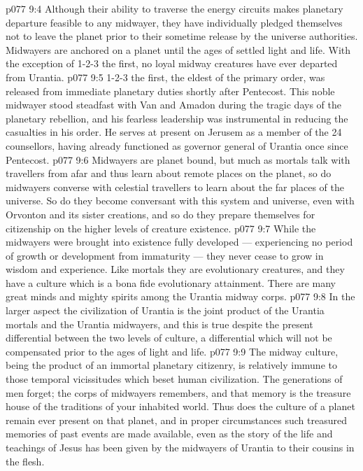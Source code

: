 \vs p077 9:4 Although their ability to traverse the energy circuits makes planetary departure feasible to any midwayer, they have individually pledged themselves not to leave the planet prior to their sometime release by the universe authorities. Midwayers are anchored on a planet until the ages of settled light and life. With the exception of 1\hyp{}2\hyp{}3 the first, no loyal midway creatures have ever departed from Urantia.
\vs p077 9:5 1\hyp{}2\hyp{}3 the first, the eldest of the primary order, was released from immediate planetary duties shortly after Pentecost. This noble midwayer stood steadfast with Van and Amadon during the tragic days of the planetary rebellion, and his fearless leadership was instrumental in reducing the casualties in his order. He serves at present on Jerusem as a member of the 24 counsellors, having already functioned as governor general of Urantia once since Pentecost.
\vs p077 9:6 \pc Midwayers are planet bound, but much as mortals talk with travellers from afar and thus learn about remote places on the planet, so do midwayers converse with celestial travellers to learn about the far places of the universe. So do they become conversant with this system and universe, even with Orvonton and its sister creations, and so do they prepare themselves for citizenship on the higher levels of creature existence.
\vs p077 9:7 While the midwayers were brought into existence fully developed --- experiencing no period of growth or development from immaturity --- they never cease to grow in wisdom and experience. Like mortals they are evolutionary creatures, and they have a culture which is a bona fide evolutionary attainment. There are many great minds and mighty spirits among the Urantia midway corps.
\vs p077 9:8 In the larger aspect the civilization of Urantia is the joint product of the Urantia mortals and the Urantia midwayers, and this is true despite the present differential between the two levels of culture, a differential which will not be compensated prior to the ages of light and life.
\vs p077 9:9 The midway culture, being the product of an immortal planetary citizenry, is relatively immune to those temporal vicissitudes which beset human civilization. The generations of men forget; the corps of midwayers remembers, and that memory is the treasure house of the traditions of your inhabited world. Thus does the culture of a planet remain ever present on that planet, and in proper circumstances such treasured memories of past events are made available, even as the story of the life and teachings of Jesus has been given by the midwayers of Urantia to their cousins in the flesh.

